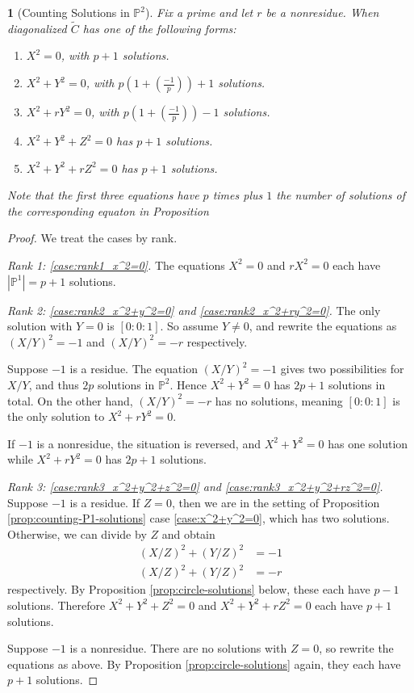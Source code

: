 \documentclass[10pt,a4paper]{amsart}
\numberwithin{equation}{section}
\numberwithin{figure}{section}
\numberwithin{table}{section}
\theoremstyle{definition}
\theoremstyle{plain}
\theoremstyle{remark}
\theoremstyle{plain}
\theoremstyle{definition}
\theoremstyle{plain}
\newtheorem{prop}[thm]{\protect\propositionname}
\theoremstyle{plain}
\providecommand{\propositionname}{Proposition}
\newcommand{\legendre}[2]{\genfrac{(}{)}{}{}{#1}{#2}}
\renewcommand{\P}{\mathbb{P}}
\begin{document}
	\begin{prop}[Counting Solutions in $\P^2$]
		\label{prop:counting-P2-solutions}
		Fix a prime and let $r$ be a nonresidue. When diagonalized $\widetilde{C}$ 
		has one of the following forms:
		\begin{enumerate} 
			\item\label{case:rank1_x^2=0} $X^2 = 0$, with $p+1$ solutions.
			\item\label{case:rank2_x^2+y^2=0} $X^2 + Y^2 = 0$, with
			$p(1+\legendre{-1}{p}) + 1$ solutions.
			\item\label{case:rank2_x^2+ry^2=0} $X^2 + rY^2 = 0$, with
			$p(1+\legendre{-1}{p}) - 1$ solutions.
			\item\label{case:rank3_x^2+y^2+z^2=0} $X^2 + Y^2 + Z^2 = 0$ has $p+1$ solutions.
			\item\label{case:rank3_x^2+y^2+rz^2=0} $X^2 + Y^2 + rZ^2 = 0$ has $p+1$ solutions.
		\end{enumerate}
		Note that the first three equations have $p$ times plus $1$ the number
		of solutions of the corresponding equaton in Proposition 
		\label{prop:counting-P1-solutions}
	\end{prop}
	\begin{proof} We treat the cases by rank.
		
		\noindent
		\textit{Rank 1: \eqref{case:rank1_x^2=0}.} 
		The equations $X^2 = 0$ and $rX^2 = 0$ each have $|\P^1|=p + 1$ solutions.
		
		\noindent
		\textit{Rank 2: \eqref{case:rank2_x^2+y^2=0} and \eqref{case:rank2_x^2+ry^2=0}.} 
		The only solution with $Y=0$ is $[0:0:1]$. So assume $Y \neq 0$, and rewrite the 
		equations as $(X/Y)^2 = -1$ and $(X/Y)^2 = -r$ respectively.
		
		Suppose $-1$ is a residue. The equation $(X/Y)^2 = -1$ gives
		two possibilities for $X/Y$, and thus $2p$ solutions in $\P^2$. Hence
		$X^2 + Y^2 = 0$ has $2p + 1$ solutions in total. On the other hand, $(X/Y)^2 =
		-r$ has no solutions, meaning $[0:0:1]$ is the only solution to $X^2 + rY^2 =
		0$.
		
		If $-1$ is a nonresidue, the situation is reversed, and $X^2 + Y^2 = 0$ has one
		solution while $X^2 + rY^2 = 0$ has $2p + 1$ solutions.
		
		\noindent
		\textit{Rank 3: \eqref{case:rank3_x^2+y^2+z^2=0} and \eqref{case:rank3_x^2+y^2+rz^2=0}.} 
		Suppose $-1$ is a residue. If $Z = 0$, then we are in the setting of
		Proposition \ref{prop:counting-P1-solutions} case \eqref{case:x^2+y^2=0}, which has two
		solutions. Otherwise, we can divide by $Z$ and obtain 
		\begin{align*} 
		(X/Z)^2 + (Y/Z)^2 &= -1 \\ 
		(X/Z)^2 + (Y/Z)^2 &= -r 
		\end{align*} 
		respectively. By Proposition \ref{prop:circle-solutions} below, these each have $p - 1$
		solutions. Therefore $X^2 + Y^2 + Z^2 = 0$ and $X^2 + Y^2 + rZ^2 = 0$ each have
		$p+1$ solutions.
		
		Suppose $-1$ is a nonresidue. There are no solutions with $Z=0$, so rewrite the
		equations as above. By Proposition \ref{prop:circle-solutions} again, they each
		have $p + 1$ solutions.
	\end{proof}
	
\end{document}
